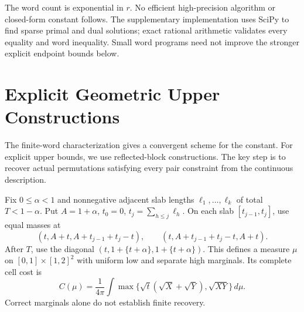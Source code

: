 \documentclass[11pt,letterpaper]{article}
\theoremstyle{definition}\newtheorem{definition}[theorem]{Definition}
\theoremstyle{remark}\newtheorem{remark}[theorem]{Remark}
\begin{document}
The word count is exponential in $r$. No efficient high-precision
algorithm or closed-form constant follows. The supplementary implementation
uses SciPy to find sparse primal and dual solutions; exact rational
arithmetic validates every equality and word inequality. Small word programs
need not improve the stronger explicit endpoint bounds below.

\section{Explicit Geometric Upper Constructions}\label{sec:upper}

The finite-word characterization gives a convergent scheme for the constant.
For explicit upper bounds, we use reflected-block constructions. The key step
is to recover actual permutations satisfying every pair constraint from the
continuous description.

Fix $0\le\alpha<1$ and nonnegative adjacent slab lengths
$\ell_1,\ldots,\ell_k$ of total $T<1-\alpha$. Put $A=1+\alpha$,
$t_0=0$, $t_j=\sum_{h\le j}\ell_h$. On each slab
$[t_{j-1},t_j]$, use equal masses at
\[
 (t,A+t,A+t_{j-1}+t_j-t),\qquad
 (t,A+t_{j-1}+t_j-t,A+t).
\]
After $T$, use the diagonal $(t,1+\{t+\alpha\},1+\{t+\alpha\})$.
This defines a measure $\mu$ on $[0,1]\times[1,2]^2$ with uniform low
and separate high marginals. Its complete cell cost is
\begin{equation}\label{eq:blockcost}
 C(\mu)=\frac1{4\pi}\int
 \max\{\sqrt t(\sqrt X+\sqrt Y),\sqrt{XY}\}\,d\mu.
\end{equation}
Correct marginals alone do not establish finite recovery.
\end{document}
